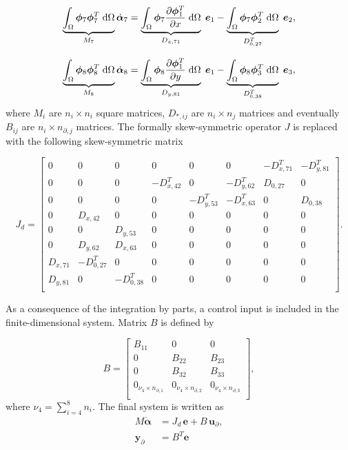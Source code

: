 \documentclass[preprint,12pt]{elsarticle}
\begin{document}
\begin{equation}
\underbrace{\int_{\Omega} \bm{\phi}_7 \bm{\phi}_7^T \d\Omega}_{M_7}  \dot{\bm{\alpha}}_7 =  \underbrace{\int_{\Omega} \bm{\phi}_7  \diffp{\bm{\phi}_1^T}{x}  \d\Omega}_{D_{x, 71}} \; \bm{e}_1 - \underbrace{\int_{\Omega} \bm{\phi}_7  \bm{\phi}_2^T \d\Omega}_{D_{0, 27}^T} \; \bm{e}_2, 
\end{equation}

\begin{equation}
\underbrace{\int_{\Omega} \bm{\phi}_8 \bm{\phi}_8^T \d\Omega}_{M_8}  \dot{\bm{\alpha}}_8 =  \underbrace{\int_{\Omega} \bm{\phi}_8  \diffp{\bm{\phi}_1^T}{y}  \d\Omega}_{D_{y, 81}} \; \bm{e}_1 - \underbrace{\int_{\Omega} \bm{\phi}_8  \bm{\phi}_3^T \d\Omega}_{D_{0, 38}^T} \; \bm{e}_3, 
\end{equation}
where $M_i$ are  $n_i\times n_i$ square matrices, $D_{*, ij}$ are $n_i \times n_j$ matrices and eventually $B_{ij}$ are $n_i \times n_{\partial, j}$ matrices.
The formally skew-symmetric operator $J$ is replaced with the following skew-symmetric matrix

\begin{equation}
J_d = 
\begin{bmatrix}
0 & 0 & 0 & 0 & 0 & 0 & -D_{x, 71}^T & -D_{y, 81}^T \\
0 & 0 & 0 & -D_{x, 42}^T & 0 & -D_{y, 62}^T & D_{0, 27} & 0 \\
0 & 0 & 0 & 0 & -D_{y, 53}^T & -D_{x, 63}^T & 0 & D_{0, 38} \\
0 & D_{x, 42} & 0 & 0 & 0 & 0 & 0 & 0\\
0 & 0 & D_{y, 53} & 0 & 0 & 0 & 0 & 0\\
0 & D_{y, 62} & D_{x, 63} & 0 & 0 & 0 & 0 & 0\\
D_{x, 71} & -D_{0, 27}^T & 0 & 0 & 0 & 0 & 0 & 0\\
D_{y, 81} & 0 & -D_{0, 38}^T & 0 & 0 & 0 & 0 & 0\\
\end{bmatrix}. 
\end{equation}

As a consequence of the integration by parts, a control input is included in the finite-dimensional system. Matrix $B$ is defined by

\begin{equation}
B = 
\begin{bmatrix}
B_{11} & 0 & 0 \\
0 & B_{22} & B_{23} \\
0 & B_{32} & B_{33} \\
0_{\nu_4 \times n_{\partial, 1}} & 0_{ \nu_4 \times n_{\partial, 2}} & 0_{\nu_4 \times n_{\partial, 3}} \\
\end{bmatrix},
\end{equation}
where $\nu_4 = \sum_{i=4}^{8} n_i$. The final system is written as
\begin{equation}
 \begin{aligned}
M \dot{\bm{\alpha}} &= J_d  \,\bm{e} + B \, \bm{u}_{\partial}, \\
\bm{y}_{\partial} &= B^T \bm{e}
\end{aligned}   
\end{equation}
\end{document}

